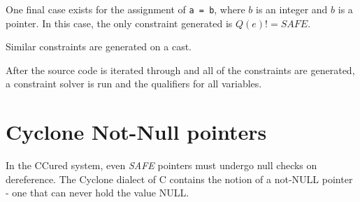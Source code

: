 One final case exists for the assignment of \verb|a = b|, where $b$ is an integer and $b$ is a pointer.
In this case, the only constraint generated is $Q(e) != SAFE$.

Similar constraints are generated on a cast.

After the source code is iterated through and all of the constraints are generated, a constraint solver is run and the qualifiers for all variables.

\section{Cyclone Not-Null pointers}

In the CCured system, even \textit{SAFE} pointers must undergo null checks on dereference.
The Cyclone dialect of C contains the notion of a not-NULL pointer - one that can never hold the value NULL.
